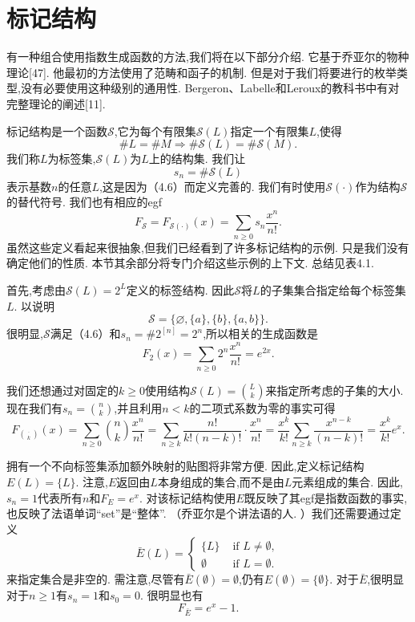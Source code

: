 \documentclass[a4paper,12pt]{ctexbook}
\begin{document}
\section{标记结构}
有一种组合使用指数生成函数的方法,我们将在以下部分介绍.  它基于乔亚尔的物种理论[47].  他最初的方法使用了范畴和函子的机制.  但是对于我们将要进行的枚举类型,没有必要使用这种级别的通用性.  
Bergeron、Labelle和Leroux的教科书中有对完整理论的阐述[11].  

{\kaishu 标记结构}是一个函数$\mathcal{S}$,它为每个有限集$\mathcal{S}(L)$指定一个有限集$L$,使得
\begin{equation}
    \# L=\# M \Longrightarrow \# \mathcal{S}(L)=\# \mathcal{S}(M). 
\end{equation}
我们称$L$为{\kaishu 标签集},$\mathcal{S}(L)$为$L$上的{\kaishu 结构集}.  我们让
$$s_n=\# \mathcal{S}(L)$$
表示基数$n$的任意$L$,这是因为（4.6）而定义完善的. 我们有时使用$\mathcal{S}(\cdot)$作为结构$\mathcal{S}$的替代符号.  我们也有相应的egf
$$
F_{\mathcal{S}}=F_{\mathcal{S}(\cdot)}(x)=\sum_{n \geq 0} s_{n} \frac{x^{n}}{n !} . 
$$
虽然这些定义看起来很抽象,但我们已经看到了许多标记结构的示例.  只是我们没有确定他们的性质.  本节其余部分将专门介绍这些示例的上下文.  总结见表4.1.  
 
首先,考虑由$\mathcal{S}(L)=2^L$定义的标签结构.  因此$\mathcal{S}$将$L$的子集集合指定给每个标签集$L$.  以说明
$$
\mathcal{S}=\{\varnothing,\{a\},\{b\},\{a,b\}\}. 
$$
很明显,$\mathcal{S}$满足（4.6）和$s_n=\#2^[n]=2^n$,所以相关的生成函数是
\begin{equation}
     F_{2}(x)=\sum_{n \geq 0}2^n\frac{x^{n}}{n !}=e^{2x}. 
\end{equation}

我们还想通过对固定的$k\ge 0$使用结构$\mathcal{S}(L)=\binom{L}{k}$来指定所考虑的子集的大小.  现在我们有$s_n=\binom{n}{k}$,并且利用$n<k$的二项式系数为零的事实可得
\begin{equation}
     F_{\binom{\cdot}{k}}(x)=\sum_{n \geq 0}\binom{n}{k}\frac{x^{n}}{n !}
     =\sum_{n \geq k} \frac{n !}{k !(n-k) !} \cdot \frac{x^{n}}{n !}
     =\frac{x^{k}}{k !} \sum_{n \geq k} \frac{x^{n-k}}{(n-k) !}
     =\frac{x^{k}}{k !} e^{x}. 
\end{equation}

拥有一个不向标签集添加额外映射的贴图将非常方便.  
因此,定义标记结构$E(L)=\{L\}$.  注意,$E$返回由$L$本身组成的集合,而不是由$L$元素组成的集合.  因此,$s_n=1$代表所有$n$和$F_E=e^x$.  对该标记结构使用$E$既反映了其egf是指数函数的事实,也反映了法语单词“set”是“整体”.  （乔亚尔是个讲法语的人.  ）我们还需要通过定义
$$
\bar{E}(L)=\begin{cases}
    \{L\} & \text { if } L \neq \emptyset, \\
	\emptyset & \text { if } L=\emptyset . 
    \end{cases} 
$$
来指定集合是非空的. 
需注意,尽管有$\bar{E}(\emptyset)=\emptyset$,仍有${E}(\emptyset)=\{\emptyset\}. $
对于$\bar{E}$,很明显对于$n\ge 1$有$s_n=1$和$s_0=0$. 
很明显也有
\begin{equation}
    F_{\bar{E}}=e^x-1. 
\end{equation}
 
\end{document}
